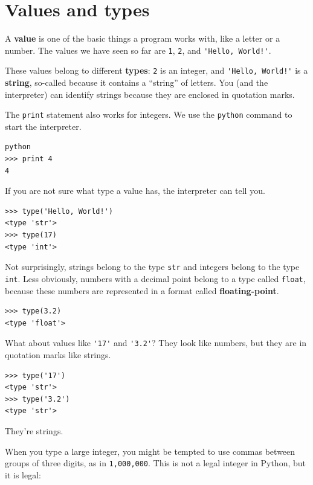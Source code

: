 \documentclass[10pt]{book}
\begin{document}
\section{Values and types}

A {\bf value} is one of the basic things a program works with,
like a letter or a
number.  The values we have seen so far
are {\tt 1}, {\tt 2}, and
\verb"'Hello, World!'".

These values belong to different {\bf types}:
{\tt 2} is an integer, and \verb"'Hello, World!'" is a {\bf string},
so-called because it contains a ``string'' of letters.
You (and the interpreter) can identify
strings because they are enclosed in quotation marks.


The {\tt print} statement also works for integers.  We use the 
{\tt python} command to start the interpreter.

\beforeverb
\begin{verbatim}
python
>>> print 4
4
\end{verbatim}
\afterverb
%
If you are not sure what type a value has, the interpreter can tell you.

\beforeverb
\begin{verbatim}
>>> type('Hello, World!')
<type 'str'>
>>> type(17)
<type 'int'>
\end{verbatim}
\afterverb
%
Not surprisingly, strings belong to the type {\tt str} and
integers belong to the type {\tt int}.  Less obviously, numbers
with a decimal point belong to a type called {\tt float},
because these numbers are represented in a
format called {\bf floating-point}.


\beforeverb
\begin{verbatim}
>>> type(3.2)
<type 'float'>
\end{verbatim}
\afterverb
%
What about values like \verb"'17'" and \verb"'3.2'"?
They look like numbers, but they are in quotation marks like
strings.


\beforeverb
\begin{verbatim}
>>> type('17')
<type 'str'>
>>> type('3.2')
<type 'str'>
\end{verbatim}
\afterverb
%
They're strings.

When you type a large integer, you might be tempted to use commas
between groups of three digits, as in {\tt 1,000,000}.  This is not a
legal integer in Python, but it is legal:
\end{document}
